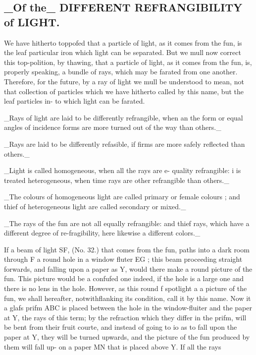 \subsection*{\_Of the\_ DIFFERENT REFRANGIBILITY of LIGHT.}
We have hitherto toppofed that a particle of light, as it comes from the fun, is the leaf particular iron which light can be separated. But we mull now correct this top-polition, by thawing, that a particle of light, as it comes from the fun, is, properly speaking, a bundle of rays, which may be farated from one another. Therefore, for the future, by a ray of light we mull be understood to mean, not that collection of particles which we have hitherto called by this name, but the leaf particles in- to which light can be farated.\par\medskip
\_Rays of light are laid to be differently refrangible, when an the form or equal angles of incidence forms are more turned out of the way than others.\_\par\medskip
\_Rays are laid to be differently refasible, if firms are more safely reflected than others.\_\par\medskip
\_Light is called homogeneous, when all the rays are e- quality refrangible: i is treated heterogeneous, when time rays are other refrangible than others.\_\par\medskip
\_The colours of homogeneous light are called primary or female colours ; and thief of heterogeneous light are called secondary or mixed.\_\par\medskip
\_The rays of the fun are not all equally refrangible: and thief rays, which have a different degree of re-fragibility, here likewise a different colors.\_\par\medskip
If a beam of light SF, (No. 32.) that comes from the fun, paths into a dark room through F a round hole in a window fluter EG ; this beam proceeding straight forwards, and falling upon a paper as Y, would there make a round picture of the fun. This picture would be a confufed one indeed, if the hole is a large one and there is no lens in the hole. However, as this round f spotlight a a picture of the fun, we shall hereafter, notwithflanking its condition, call it by this name. Now it a glafs prifm ABC is placed between the hole in the window-fluiter and the paper at Y, the rays of this term; by the refraction which they differ in the prifm, will be bent from their fruit courte, and instead of going to io as to fall upon the paper at Y, they will be turned upwards, and the picture of the fun produced by them will fall up- on a paper MN that is placed above Y. If all the rays\par\medskip

